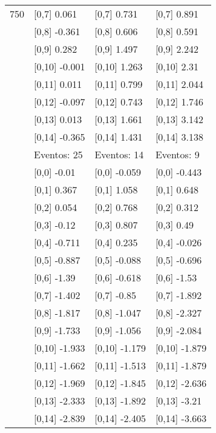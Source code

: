 \begin{table}
\begin{tabular}[t]{llll}
750 & {}[0,7] 0.061 & {}[0,7] 0.731 & {}[0,7] 0.891\\
\addlinespace
 & {}[0,8] -0.361 & {}[0,8] 0.606 & {}[0,8] 0.591\\
 & {}[0,9] 0.282 & {}[0,9] 1.497 & {}[0,9] 2.242\\
 & {}[0,10] -0.001 & {}[0,10] 1.263 & {}[0,10] 2.31\\
 & {}[0,11] 0.011 & {}[0,11] 0.799 & {}[0,11] 2.044\\
 & {}[0,12] -0.097 & {}[0,12] 0.743 & {}[0,12] 1.746\\
\addlinespace
 & {}[0,13] 0.013 & {}[0,13] 1.661 & {}[0,13] 3.142\\
 & {}[0,14] -0.365 & {}[0,14] 1.431 & {}[0,14] 3.138\\
 & Eventos:  25 & Eventos:  14 & Eventos:  9\\
 & {}[0,0] -0.01 & {}[0,0] -0.059 & {}[0,0] -0.443\\
 & {}[0,1] 0.367 & {}[0,1] 1.058 & {}[0,1] 0.648\\
\addlinespace
 & {}[0,2] 0.054 & {}[0,2] 0.768 & {}[0,2] 0.312\\
 & {}[0,3] -0.12 & {}[0,3] 0.807 & {}[0,3] 0.49\\
 & {}[0,4] -0.711 & {}[0,4] 0.235 & {}[0,4] -0.026\\
 & {}[0,5] -0.887 & {}[0,5] -0.088 & {}[0,5] -0.696\\
 & {}[0,6] -1.39 & {}[0,6] -0.618 & {}[0,6] -1.53\\
\addlinespace
1000 & {}[0,7] -1.402 & {}[0,7] -0.85 & {}[0,7] -1.892\\
 & {}[0,8] -1.817 & {}[0,8] -1.047 & {}[0,8] -2.327\\
 & {}[0,9] -1.733 & {}[0,9] -1.056 & {}[0,9] -2.084\\
 & {}[0,10] -1.933 & {}[0,10] -1.179 & {}[0,10] -1.879\\
 & {}[0,11] -1.662 & {}[0,11] -1.513 & {}[0,11] -1.879\\
\addlinespace
 & {}[0,12] -1.969 & {}[0,12] -1.845 & {}[0,12] -2.636\\
 & {}[0,13] -2.333 & {}[0,13] -1.892 & {}[0,13] -3.21\\
 & {}[0,14] -2.839 & {}[0,14] -2.405 & {}[0,14] -3.663\\
\bottomrule
\end{tabular}
\end{table}

